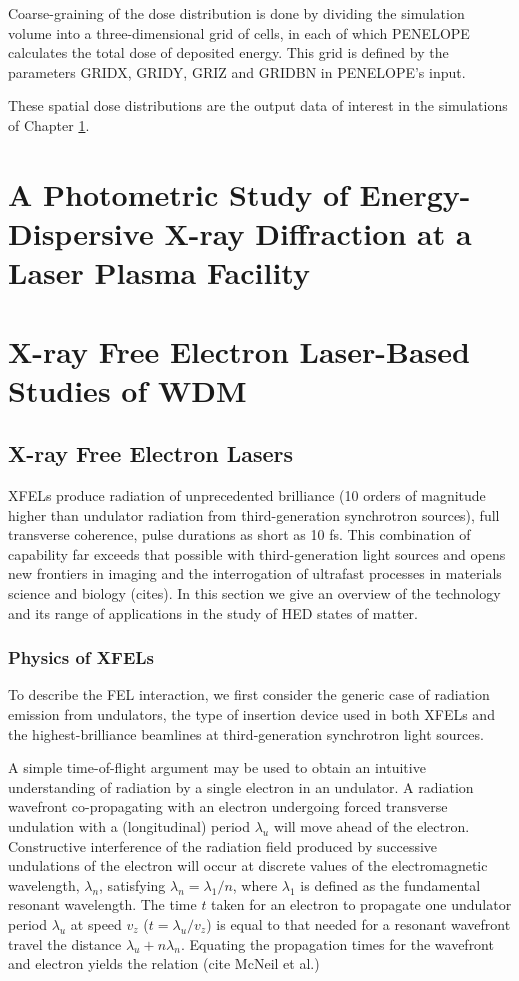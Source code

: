 \documentclass [11pt, proquest, article] {uwthesis}[2016/11/22]
\begin{document}
Coarse-graining of the dose distribution is done by dividing the simulation volume into a three-dimensional grid of cells, in each of which PENELOPE calculates the total dose of deposited energy. This grid is defined by the parameters GRIDX, GRIDY, GRIZ and GRIDBN in PENELOPE's input.

These spatial dose distributions are the output data of interest in the simulations of Chapter \ref{hef}.



\chapter{A Photometric Study of Energy-Dispersive X-ray Diffraction at a Laser Plasma Facility}
\label{hef}


\chapter{X-ray Free Electron Laser-Based Studies of WDM}
\section{X-ray Free Electron Lasers}
XFELs produce radiation of unprecedented brilliance (10 orders of magnitude higher than undulator radiation from third-generation synchrotron sources), full transverse coherence, pulse durations as short as 10 fs. This combination of capability far exceeds that possible with third-generation light sources and opens new frontiers in imaging and the interrogation of ultrafast processes in materials science and biology (cites). In this section we give an overview of the technology and its range of applications in the study of HED states of matter.

\subsection{Physics of XFELs}
To describe the FEL interaction, we first consider the generic case of radiation emission from undulators, the type of insertion device used in both XFELs and the highest-brilliance beamlines at third-generation synchrotron light sources.

A simple time-of-flight argument may be used to obtain an intuitive understanding of radiation by a single electron in an undulator. A radiation wavefront co-propagating with an electron undergoing forced transverse undulation with a (longitudinal) period $\lambda_u$ will move ahead of the electron. Constructive interference of the radiation field produced by successive undulations of the electron will occur at discrete values of the electromagnetic wavelength, $\lambda_n$, satisfying $\lambda_n = \lambda_1 / n$, where $\lambda_1$ is defined as the fundamental resonant wavelength. The time $t$ taken for an electron to propagate one undulator period $\lambda_u$ at speed $v_z$ ($t = \lambda_u/v_z$) is equal to that needed for a resonant wavefront travel the distance $\lambda_u + n \lambda_n$. Equating the propagation times for the wavefront and electron yields the relation (cite McNeil et al.)
\end{document}
